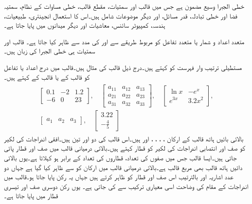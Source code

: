 خطی الجبرا وسیع مضمون ہے جس میں قالب اور سمتیات، مقطع قالب، خطی مساوات کے نظام، سمتیہ فضا اور  خطی تبادلہ،  قدر مسائل، اور دیگر موضوعات شامل ہیں۔اس کا استعمال انجینئری، طبیعیات، ہندسہ، کمپیوٹر سائنس، معاشیات اور دیگر میدانوں میں پایا جاتا ہے۔

متعدد اعداد و شمار یا متعدد تفاعل کو مربوط طریقے سے  اور  کی مدد سے ظاہر کیا جاتا ہے۔ قالب اور سمتیات ہی خطی الجبرا کی زبان ہیں۔



مستطیلی ترتیب وار فہرست کو  کہتے ہیں۔درج ذیل قالب کی مثال ہیں۔قالب میں درج اعداد یا تفاعل کو قالب کے  یا قالب کے  کہتے ہیں۔ 
\begin{gather}
\begin{aligned}\label{مساوات_قالب_عمومی_قالب_الف}
\begin{bmatrix}
0.1& -2 & 1.2\\
-6 & 0 & 23
\end{bmatrix}, \quad
\begin{bmatrix}
a_{11}& a_{12} & a_{13}\\
a_{21} & a_{22} & a_{23}\\
a_{31} & a_{32} & a_{33}
\end{bmatrix}, \quad
\begin{bmatrix}
\ln x& -e^x\\
e^{3x}& 3.2x^2
\end{bmatrix},\\
\begin{bmatrix}
a_{1} & a_{2} & a_{3}
\end{bmatrix},\quad 
\begin{bmatrix}
3.22\\
-\tfrac{4}{5}
\end{bmatrix}
\end{aligned}
\end{gather}
بالائی بائیں ہاتھ قالب کے ارکان ، ، ، ،  اور  ہیں۔اس قالب کی  دو  اور تین  ہیں۔افقی اندراجات کی لکیر کو صف اور انتصابی اندراجات کی لکیر کو قطار کہتے ہیں۔بالائی درمیانی قالب میں  صف اور  قطار پائی  جاتی ہیں۔ایسا قالب جس میں صفوں کی تعداد، قطاروں کی تعداد کے برابر ہو   کہلاتا ہے۔یوں بالائی دائیں ہاتھ قالب بھی مربع قالب ہے۔بالائی درمیانی قالب میں ارکان کو  سے ظاہر کیا گیا ہے جہاں دو عدد اشاریہ  اور  بالترتیب اس صف اور قطار کو ظاہر کرتے ہیں جہاں یہ رکن پایا جاتا ہو۔قالب میں اندراجات کے مقام کی وضاحت اسی معیاری ترکیب سے کی جاتی ہے۔ یوں  رکن دوسری  صف اور تیسری  قطار میں پایا جاتا ہے۔

